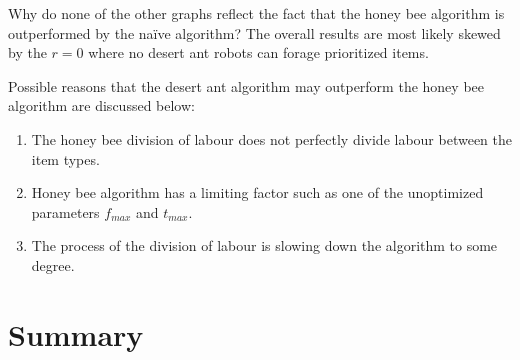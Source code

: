 Why do none of the other graphs reflect the fact that the honey bee algorithm is outperformed by the na\"ive algorithm? The overall results are most likely skewed by the $r=0$ where no desert ant robots can forage prioritized items. 

Possible reasons that the desert ant algorithm may outperform the honey bee algorithm are discussed below:
\begin{enumerate}
\item The honey bee division of labour does not perfectly divide labour between the item types.
\item Honey bee algorithm has a limiting factor such as one of the unoptimized parameters $f_{max}$ and $t_{max}$. 
\item The process of the division of labour is slowing down the algorithm to some degree.
\end{enumerate}


\section{Summary}
\label{results:summary}


